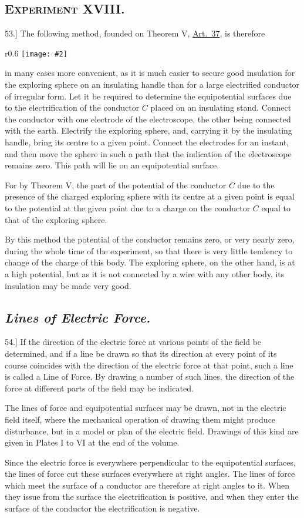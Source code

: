 \documentclass[12pt,oneside]{book}[2021/10/04]
\newcommand{\Heading}{\centering\normalfont}
\newcommand{\Section}[1]{\subsection*{\normalsize\Heading\scshape #1}}
\newcommand{\Subsection}[1]{\subsection*{\normalsize\Heading\itshape #1}}
\newcommand{\Runhead}[1]{\fancyhead[C]{\iffloatpage{}{\small#1}}}
\newcommand{\article}[1]{\phantomsection \label{art:#1}{#1.]}}
\newcommand{\wrapfig}[3]{
\begin{wrapfigure}{r}{#1\textwidth}
\centering
\texttt{[image: \#2]}
\caption*{\small #3}
\end{wrapfigure}}
\newcommand{\¬}{\hphantom{0}}
\begin{document}
\Section{Experiment XVIII.}

\article{53} The following method, founded on Theorem V, \hyperref[art:37]{Art.\ 37}, is
therefore
\wrapfig{0.6}{059.png}{Fig. 16.}
in many cases more convenient, as it is much easier to
secure good insulation
for the exploring sphere
on an insulating handle
than for a large electrified
conductor of irregular
form. Let it be required
to determine the
equipotential surfaces
due to the electrification
of the conductor \(C\) placed
on an insulating stand.
Connect the conductor
with one electrode of the
electroscope, the other
being connected with
the earth. Electrify the
exploring sphere, and,
carrying it by the insulating handle, bring its centre to a given
point. Connect the electrodes for an instant, and then move the
sphere in such a path that the indication of the electroscope remains
zero. This path will lie on an equipotential surface.

For by Theorem V, the part of the potential of the conductor \(C\)
due to the presence of the charged exploring sphere with its centre
at a given point is equal to the potential at the given point due to
a charge on the conductor \(C\) equal to that of the exploring sphere.

By this method the potential of the conductor remains zero, or
very nearly zero, during the whole time of the experiment, so that
there is very little tendency to change of the charge of this body.
The exploring sphere, on the other hand, is at a high potential, but
as it is not connected by a wire with any other body, its insulation
may be made very good.

\Subsection{Lines of Electric Force.}

\article{54} If the direction of the electric force at various points of the
field be determined, and if a line be drawn so that its direction at
every point of its course coincides with the direction of the electric
force at that point, such a line is called a Line of Force. By
drawing a number of such lines, the direction of the force at
different parts of the field may be indicated.
\Runhead{LINES OF ELECTRIC FORCE.}

The lines of force and equipotential surfaces may be drawn, not in
the electric field itself, where the mechanical operation of drawing
them might produce disturbance, but in a model or plan of the
electric field. Drawings of this kind are given in Plates I to VI
at the end of the volume.

Since the electric force is everywhere perpendicular to the equipotential
surfaces, the lines of force cut these surfaces everywhere
at right angles. The lines of force which meet the surface of a
conductor are therefore at right angles to it. When they issue from
the surface the electrification is positive, and when they enter the
surface of the conductor the electrification is negative.
\end{document}
